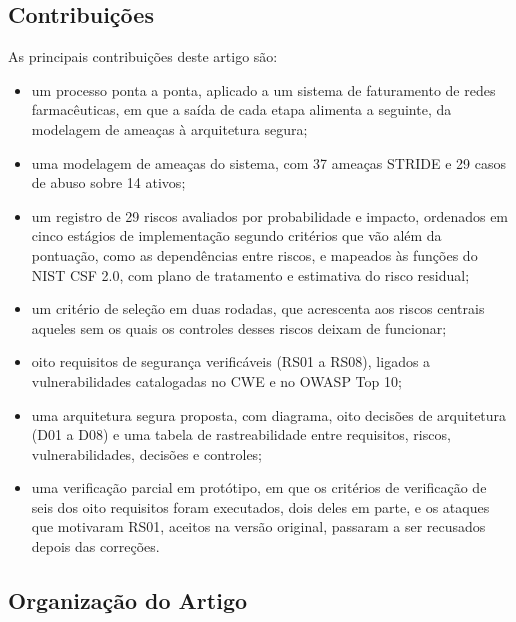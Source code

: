 \documentclass[conference]{IEEEtran}
\begin{document}
\subsection{Contribuições}

As principais contribuições deste artigo são:

\begin{itemize}
    \item um processo ponta a ponta, aplicado a um sistema de faturamento de redes farmacêuticas, em que a saída de cada etapa alimenta a seguinte, da modelagem de ameaças à arquitetura segura;
    \item uma modelagem de ameaças do sistema, com 37 ameaças STRIDE e 29 casos de abuso sobre 14 ativos;
    \item um registro de 29 riscos avaliados por probabilidade e impacto, ordenados em cinco estágios de implementação segundo critérios que vão além da pontuação, como as dependências entre riscos, e mapeados às funções do NIST CSF 2.0, com plano de tratamento e estimativa do risco residual;
    \item um critério de seleção em duas rodadas, que acrescenta aos riscos centrais aqueles sem os quais os controles desses riscos deixam de funcionar;
    \item oito requisitos de segurança verificáveis (RS01 a RS08), ligados a vulnerabilidades catalogadas no CWE e no OWASP Top 10;
    \item uma arquitetura segura proposta, com diagrama, oito decisões de arquitetura (D01 a D08) e uma tabela de rastreabilidade entre requisitos, riscos, vulnerabilidades, decisões e controles;
    \item uma verificação parcial em protótipo, em que os critérios de verificação de seis dos oito requisitos foram executados, dois deles em parte, e os ataques que motivaram RS01, aceitos na versão original, passaram a ser recusados depois das correções.
\end{itemize}

\subsection{Organização do Artigo}
\end{document}
